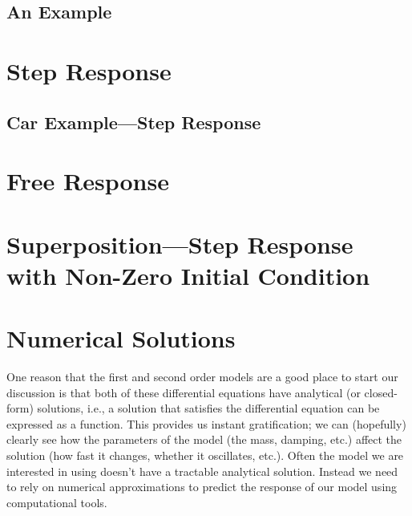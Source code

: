 
\subsection{An Example}


\section{Step Response}\label{s:firststep}

\subsection{Car Example---Step Response}


\section{Free Response}


\section{Superposition---Step Response with Non-Zero Initial Condition}









\section{Numerical Solutions}
One reason that the first and second order models are a good place to start our discussion is that both of these differential equations have analytical (or closed-form) solutions, i.e., a solution that satisfies the differential equation can be expressed as a function.  This provides us instant gratification; we can (hopefully) clearly see how the parameters of the model (the mass, damping, etc.) affect the solution (how fast it changes, whether it oscillates, etc.).   Often the model we are interested in using doesn't have a tractable analytical solution.  Instead we need to rely on numerical approximations to predict the response of our model using computational tools.

